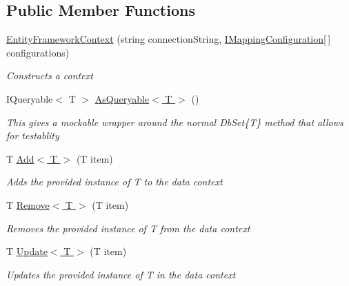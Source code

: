 \subsection*{Public Member Functions}
\begin{DoxyCompactItemize}
\item 
\hyperlink{class_highway_1_1_data_1_1_entity_framework_1_1_contexts_1_1_entity_framework_context_a45502d0390821379b888a6b9e712e8b5}{Entity\-Framework\-Context} (string connection\-String, \hyperlink{interface_highway_1_1_data_1_1_entity_framework_1_1_mappings_1_1_i_mapping_configuration}{I\-Mapping\-Configuration}\mbox{[}$\,$\mbox{]} configurations)
\begin{DoxyCompactList}\small\item\em Constructs a context \end{DoxyCompactList}\item 
I\-Queryable$<$ T $>$ \hyperlink{class_highway_1_1_data_1_1_entity_framework_1_1_contexts_1_1_entity_framework_context_a4af775d2ca582477cfc53daa5903fab5}{As\-Queryable$<$ T $>$} ()
\begin{DoxyCompactList}\small\item\em This gives a mockable wrapper around the normal Db\-Set\{\-T\} method that allows for testablity \end{DoxyCompactList}\item 
T \hyperlink{class_highway_1_1_data_1_1_entity_framework_1_1_contexts_1_1_entity_framework_context_a8d50357ea11414364e9155ef79048b21}{Add$<$ T $>$} (T item)
\begin{DoxyCompactList}\small\item\em Adds the provided instance of {\itshape T}  to the data context \end{DoxyCompactList}\item 
T \hyperlink{class_highway_1_1_data_1_1_entity_framework_1_1_contexts_1_1_entity_framework_context_a36b80fcc6db41fd1036bbc4ea466294b}{Remove$<$ T $>$} (T item)
\begin{DoxyCompactList}\small\item\em Removes the provided instance of {\itshape T}  from the data context \end{DoxyCompactList}\item 
T \hyperlink{class_highway_1_1_data_1_1_entity_framework_1_1_contexts_1_1_entity_framework_context_a3746422e9f70039d208c6dd6be02327e}{Update$<$ T $>$} (T item)
\begin{DoxyCompactList}\small\item\em Updates the provided instance of {\itshape T}  in the data context \end{DoxyCompactList}\item 

\end{DoxyCompactItemize}
